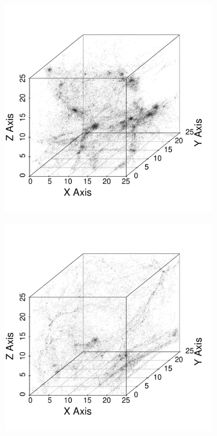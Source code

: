 \documentclass[12pt]{article}
\begin{document}
\begin{figure}[htp!]
  \centering
  \begin{subfigure}{0.25\textwidth}
    \centering
        \caption{}
  \includegraphics[width=\linewidth]{figure_10_cdm_slice_17.pdf}
    \label{fig:cubeDiagsA}
  \end{subfigure}
    \begin{subfigure}{0.25\textwidth}
    \centering
        \caption{}
  \includegraphics[width=\linewidth]{figure_10_cdm_slice_34.pdf}

\end{subfigure}
\end{figure}
\end{document}
